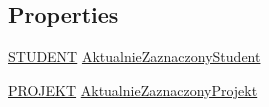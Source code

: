 \subsection*{Properties}
\begin{DoxyCompactItemize}
\item 
\hyperlink{class_dziennik_ocen_1_1_s_t_u_d_e_n_t}{S\+T\+U\+D\+E\+NT} \hyperlink{class_dziennik_ocen_1_1_form_prowadzacy_affdca976e8a2ca32c6aef4f70a7996d2}{Aktualnie\+Zaznaczony\+Student}
\item 
\hyperlink{class_dziennik_ocen_1_1_p_r_o_j_e_k_t}{P\+R\+O\+J\+E\+KT} \hyperlink{class_dziennik_ocen_1_1_form_prowadzacy_adf43b053c3531f1dc0a758e08a282955}{Aktualnie\+Zaznaczony\+Projekt}
\end{DoxyCompactItemize}
